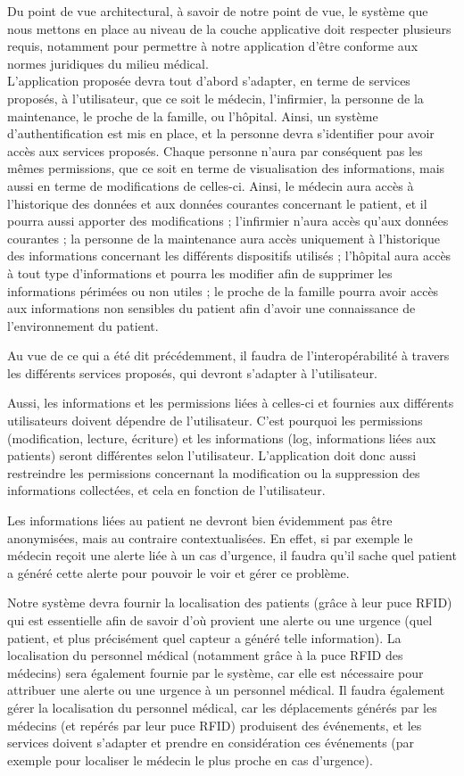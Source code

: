 Du point de vue architectural, à savoir de notre point de vue, le système que nous mettons en place au niveau de la couche applicative doit respecter plusieurs requis, notamment pour permettre à notre application d'être conforme aux normes juridiques du milieu médical.
\\

L'application proposée devra tout d'abord s’adapter, en terme de services proposés, à l’utilisateur, que ce soit le médecin, l'infirmier, la personne de la maintenance, le proche de la famille, ou l'hôpital. Ainsi, un système d’authentification est mis en place, et la personne devra s’identifier pour avoir accès aux services proposés. Chaque personne n’aura par conséquent pas les mêmes permissions, que ce soit en terme de visualisation des informations, mais aussi en terme de modifications de celles-ci. Ainsi, le médecin aura accès à l’historique des données et aux données courantes concernant le patient, et il pourra aussi apporter des modifications ; l’infirmier n’aura accès qu’aux données courantes ; la personne de la maintenance aura accès uniquement à l’historique des informations concernant les différents dispositifs utilisés ; l'hôpital aura accès à tout type d'informations et pourra les modifier afin de supprimer les informations périmées ou non utiles ; le proche de la famille pourra avoir accès aux informations non sensibles du patient afin d'avoir une connaissance de l'environnement du patient.

Au vue de ce qui a été dit précédemment, il faudra de l'interopérabilité à travers les différents services proposés, qui devront s'adapter à l'utilisateur.

Aussi, les informations et les permissions liées à celles-ci et fournies aux différents utilisateurs doivent dépendre de l’utilisateur. C'est pourquoi les permissions (modification, lecture, écriture) et les informations (log, informations liées aux patients) seront différentes selon l’utilisateur. L’application doit donc aussi restreindre les permissions concernant la modification ou la suppression des informations collectées, et cela en fonction de l'utilisateur.

Les informations liées au patient ne devront bien évidemment pas être anonymisées, mais au contraire contextualisées. En effet, si par exemple le médecin reçoit une alerte liée à un cas d'urgence, il faudra qu'il sache quel patient a généré cette alerte pour pouvoir le voir et gérer ce problème.

Notre système devra fournir la localisation des patients (grâce à leur puce RFID) qui est essentielle afin de savoir d'où provient une alerte ou une urgence (quel patient, et plus précisément quel capteur a généré telle information). La localisation du personnel médical (notamment grâce à la puce RFID des médecins) sera également fournie par le système, car elle est nécessaire pour attribuer une alerte ou une urgence à un personnel médical. Il faudra également gérer la localisation du personnel médical, car les déplacements générés par les médecins (et repérés par leur puce RFID) produisent des événements, et les services doivent s'adapter et prendre en considération ces événements (par exemple pour localiser le médecin le plus proche en cas d'urgence).

